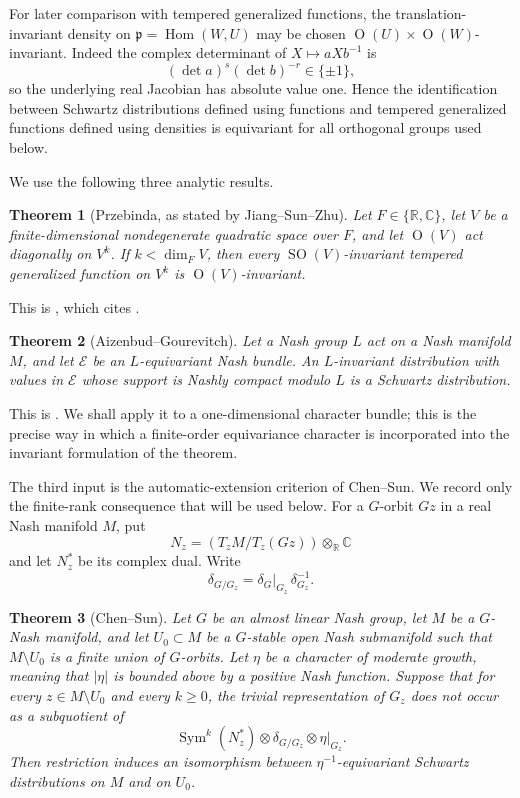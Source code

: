\documentclass[10pt,a4paper]{amsart}
\numberwithin{equation}{section}
\newtheorem{theorem}{Theorem}[section]
\newcommand{\C}{\mathbb C}
\newcommand{\R}{\mathbb R}
\newcommand{\SO}{\operatorname{SO}}
\newcommand{\Or}{\operatorname{O}}
\newcommand{\Sym}{\operatorname{Sym}}
\newcommand{\Hom}{\operatorname{Hom}}
\newcommand{\fp}{\mathfrak p}
\begin{document}
For later comparison with tempered generalized functions, the
translation-invariant density on $\fp=\Hom(W,U)$ may be chosen
$\Or(U)\times\Or(W)$-invariant.  Indeed the complex determinant of
$X\mapsto aXb^{-1}$ is
\[
  (\det a)^s(\det b)^{-r}\in\{\pm1\},
\]
so the underlying real Jacobian has absolute value one.  Hence the
identification between Schwartz distributions defined using functions and
tempered generalized functions defined using densities is equivariant for
all orthogonal groups used below.

We use the following three analytic results.

\begin{theorem}[Przebinda, as stated by Jiang--Sun--Zhu]\label{spin:thm:Przebinda}
Let $F\in\{\R,\C\}$, let $V$ be a finite-dimensional nondegenerate quadratic
space over $F$, and let $\Or(V)$ act diagonally on $V^k$.  If
$k<\dim_F V$, then every $\SO(V)$-invariant tempered generalized function on
$V^k$ is $\Or(V)$-invariant.
\end{theorem}

This is \cite[Proposition~1.5]{JSZ}, which cites
\cite[Theorem~C.7]{Przebinda}.

\begin{theorem}[Aizenbud--Gourevitch]\label{spin:thm:AGcompact}
Let a Nash group $L$ act on a Nash manifold $M$, and let $\mathcal E$ be an
$L$-equivariant Nash bundle.  An $L$-invariant distribution with values in
$\mathcal E$ whose support is Nashly compact modulo $L$ is a Schwartz
distribution.
\end{theorem}

This is \cite[Theorem~B.4.1]{AG09}.  We shall apply it to a one-dimensional
character bundle; this is the precise way in which a finite-order equivariance
character is incorporated into the invariant formulation of the theorem.

The third input is the automatic-extension criterion of Chen--Sun.  We record
only the finite-rank consequence that will be used below.  For a $G$-orbit
$Gz$ in a real Nash manifold $M$, put
\[
  N_z=(T_zM/T_z(Gz))\otimes_{\R}\C
\]
and let $N_z^*$ be its complex dual.  Write
\[
  \delta_{G/G_z}=\delta_G|_{G_z}\,\delta_{G_z}^{-1}.
\]

\begin{theorem}[Chen--Sun]\label{spin:thm:ChenSun}
Let $G$ be an almost linear Nash group, let $M$ be a $G$-Nash manifold, and
let $U_0\subset M$ be a $G$-stable open Nash submanifold such that
$M\setminus U_0$ is a finite union of $G$-orbits.  Let $\eta$ be a character
of moderate growth, meaning that $|\eta|$ is bounded above by a positive Nash
function.  Suppose that for every $z\in M\setminus U_0$ and every
$k\ge0$, the trivial representation of $G_z$ does not occur as a subquotient
of
\begin{equation}\label{spin:eq:CS-general}
  \Sym^k(N_z^*)\otimes\delta_{G/G_z}\otimes\eta|_{G_z}.
\end{equation}
Then restriction induces an isomorphism between $\eta^{-1}$-equivariant
Schwartz distributions on $M$ and on $U_0$.
\end{theorem}
\end{document}
